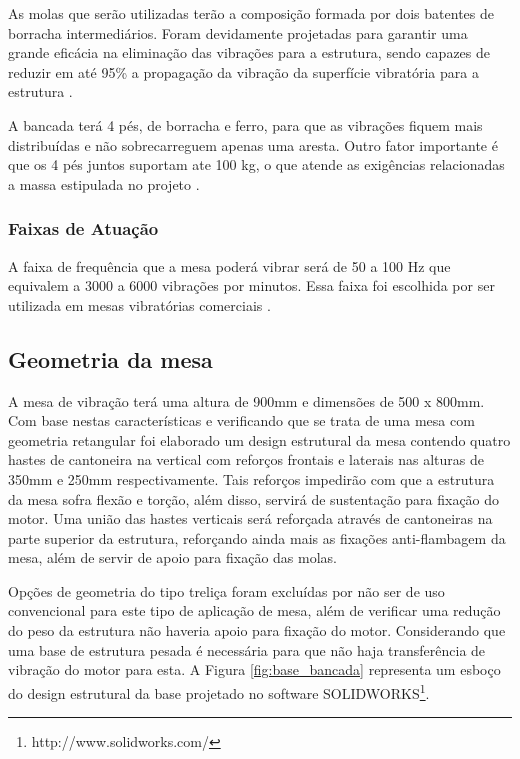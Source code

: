 	As molas que serão utilizadas terão a composição formada por dois batentes de borracha intermediários. Foram devidamente projetadas para garantir uma grande eficácia na eliminação das vibrações para a estrutura, sendo capazes de reduzir em até 95\% a propagação da vibração da superfície vibratória para a estrutura \cite{mola_catalogo}.
    
    A bancada terá 4 pés, de borracha e ferro, para que as vibrações fiquem mais distribuídas e não sobrecarreguem apenas uma aresta. Outro fator importante é que os 4 pés juntos suportam ate 100 kg, o que atende as exigências relacionadas a massa estipulada no projeto \cite{ferramentas_kennedy}.


\subsubsection*{\textbf{Faixas de Atuação}}
A faixa de frequência que a mesa poderá vibrar será de 50 a 100 Hz que equivalem a 3000 a 6000 vibrações por minutos. Essa faixa foi escolhida por ser utilizada em mesas vibratórias comerciais \cite{ricardo_jose}.

\subsection*{\textbf{Geometria da mesa}}

	A mesa de vibração terá uma altura de 900mm e dimensões de 500 x 800mm. Com base nestas características e verificando que se trata de uma mesa com geometria retangular foi elaborado um design estrutural da mesa contendo quatro hastes de cantoneira na vertical com reforços frontais e laterais nas alturas de 350mm e 250mm respectivamente. Tais reforços impedirão com que a estrutura da mesa sofra flexão e torção, além disso, servirá de sustentação para fixação do motor. Uma união das hastes verticais será reforçada através de cantoneiras na parte superior da estrutura, reforçando ainda mais as fixações anti-flambagem da mesa, além de servir de apoio para fixação das molas. 
    
    Opções de geometria do tipo treliça foram excluídas por não ser de uso convencional para este tipo de aplicação de mesa, além de verificar uma redução do peso da estrutura não haveria apoio para fixação do motor. Considerando que uma base de estrutura pesada é necessária para que não haja transferência de vibração do motor para esta. A Figura \ref{fig:base_bancada} representa um esboço do design estrutural da base projetado no software SOLIDWORKS\footnote{http://www.solidworks.com/}.

